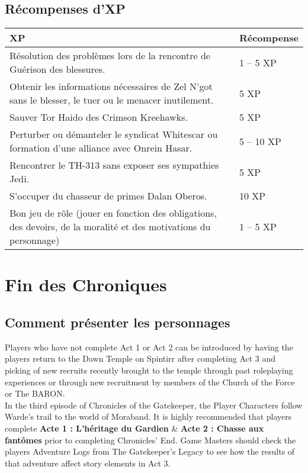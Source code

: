 \documentclass[twoside]{article}
\begin{document}
\subsection{Récompenses d'XP}
\begin{tabular}{|p{12cm}|p{4cm}|}
	\hline 
	\cellcolor{DarkRed} {\large \textcolor{PureWhite}{\textbf{XP}}} & \cellcolor{DarkRed} {\large \textcolor{PureWhite}{\textbf{Récompense}}} \\ 
	\hline 
	Résolution des problèmes lors de la rencontre de Guérison des blessures. & 1 -- 5 XP \\ 
	\hline 
	Obtenir les informations nécessaires de Zel N'got sans le blesser, le tuer ou le menacer inutilement. & 5 XP \\ 
	\hline 
	Sauver Tor Haido des Crimson Kreehawks. & 5 XP \\
	\hline 
	Perturber ou démanteler le syndicat Whitescar ou formation d'une alliance avec Onrein Hasar. & 5 -- 10 XP \\
	\hline 
	Rencontrer le TH-313 sans exposer ses sympathies Jedi. & 5 XP \\
	\hline 
	S'occuper du chasseur de primes Dalan Oberos. & 10 XP \\
	\hline 
	Bon jeu de rôle (jouer en fonction des obligations, des devoirs, de la moralité et des motivations du personnage) & 1 -- 5 XP \\
	\hline 
\end{tabular}


\section{Fin des Chroniques}
\subsection{Comment présenter les personnages}
Players who have not complete Act 1 or Act 2 can be introduced by having the players return to the Dawn Temple on Spintirr after completing Act 3 and picking of new recruits recently brought to the temple through past roleplaying experiences or through new recruitment by members of the Church of the Force or The BARON.\\

In the third episode of Chronicles of the Gatekeeper, the Player Characters follow Warde's trail to the world of Moraband.  It is highly recommended that players complete \textbf{Acte 1 : L'héritage du Gardien} \& \textbf{Acte 2 : Chasse aux fantômes} prior to completing Chronicles' End.  Game Masters should check the players Adventure Logs from The Gatekeeper's Legacy to see how the results of that adventure affect story elements in Act 3.\\
\end{document}
